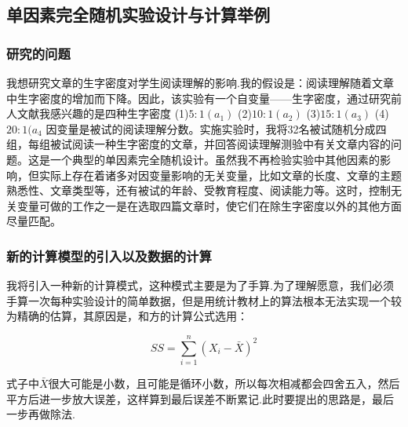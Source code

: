 \subsection{单因素完全随机实验设计与计算举例}

\subsubsection{研究的问题}
我想研究文章的生字密度对学生阅读理解的影响.我的假设是：阅读理解随着文章中生字密度的增加而下降。因此，该实验有一个自变量——生字密度，通过研究前人文献我感兴趣的是四种生字密度
(1)$5:1(a_1)$
(2)$10:1(a_2)$
(3)$15:1(a_3)$
(4)$20:1(a_4$
因变量是被试的阅读理解分数。实施实验时，我将32名被试随机分成四组，每组被试阅读一种生字密度的文章，并回答阅读理解测验中有关文章内容的问题。这是一个典型的单因素完全随机设计。虽然我不再检验实验中其他因素的影响，但实际上存在着诸多对因变量影响的无关变量，比如文章的长度、文章的主题熟悉性、文章类型等，还有被试的年龄、受教育程度、阅读能力等。这时，控制无关变量可做的工作之一是在选取四篇文章时，使它们在除生字密度以外的其他方面尽量匹配。

\subsubsection{新的计算模型的引入以及数据的计算}
我将引入一种新的计算模式，这种模式主要是为了手算.为了理解愿意，我们必须手算一次每种实验设计的简单数据，但是用统计教材上的算法根本无法实现一个较为精确的估算，其原因是，和方的计算公式选用：

$$
    SS =
        \sum\limits_{i=1}^{n}
        \left( 
            X_i -\bar{X} 
        \right)^2
$$

式子中$\bar{X}$很大可能是小数，且可能是循环小数，所以每次相减都会四舍五入，然后平方后进一步放大误差，这样算到最后误差不断累记.此时要提出的思路是，最后一步再做除法.

